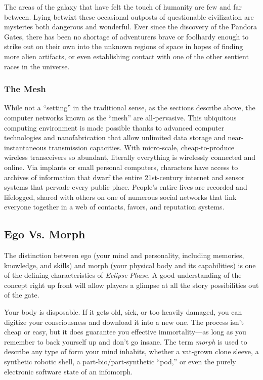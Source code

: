The areas of the galaxy that have felt the touch of 
humanity are few and far between. Lying betwixt 
these occasional outposts of questionable civilization 
are mysteries both dangerous and wonderful. Ever 
since the discovery of the Pandora Gates, there has 
been no shortage of adventurers brave or foolhardy 
enough to strike out on their own into the unknown 
regions of space in hopes of finding more alien artifacts, or even establishing contact with one of the 
other sentient races in the universe.

\subsubsection{The Mesh}

While not a ``setting'' in the traditional sense, as 
the sections describe above, the computer networks known as the ``mesh'' are all-pervasive. This 
ubiquitous computing environment is made possible thanks to advanced computer technologies and 
nanofabrication that allow unlimited data storage 
and near-instantaneous transmission capacities. With 
micro-scale, cheap-to-produce wireless transceivers so 
abundant, literally everything is wirelessly connected 
and online. Via implants or small personal computers, characters have access to archives of information 
that dwarf the entire 21st-century internet and sensor 
systems that pervade every public place. People's 
entire lives are recorded and lifelogged, shared with 
others on one of numerous social networks that link 
everyone together in a web of contacts, favors, and 
reputation systems.

\subsection{Ego Vs. Morph}

The distinction between ego (your mind and personality, including memories, knowledge, and skills) 
and morph (your physical body and its capabilities) 
is one of the defining characteristics of \textit{Eclipse }
\textit{Phase}. A good understanding of the concept right 
up front will allow players a glimpse at all the story 
possibilities out of the gate.

Your body is disposable. If it gets old, sick, or too 
heavily damaged, you can digitize your consciousness and download it into a new one. The process 
isn't cheap or easy, but it does guarantee you effective immortality—as long as you remember to 
back yourself up and don't go insane. The term 
\textit{morph }is used to describe any type of form your 
mind inhabits, whether a vat-grown clone sleeve, 
a synthetic robotic shell, a part-bio/part-synthetic 
``pod,'' or even the purely electronic software state 
of an infomorph.

